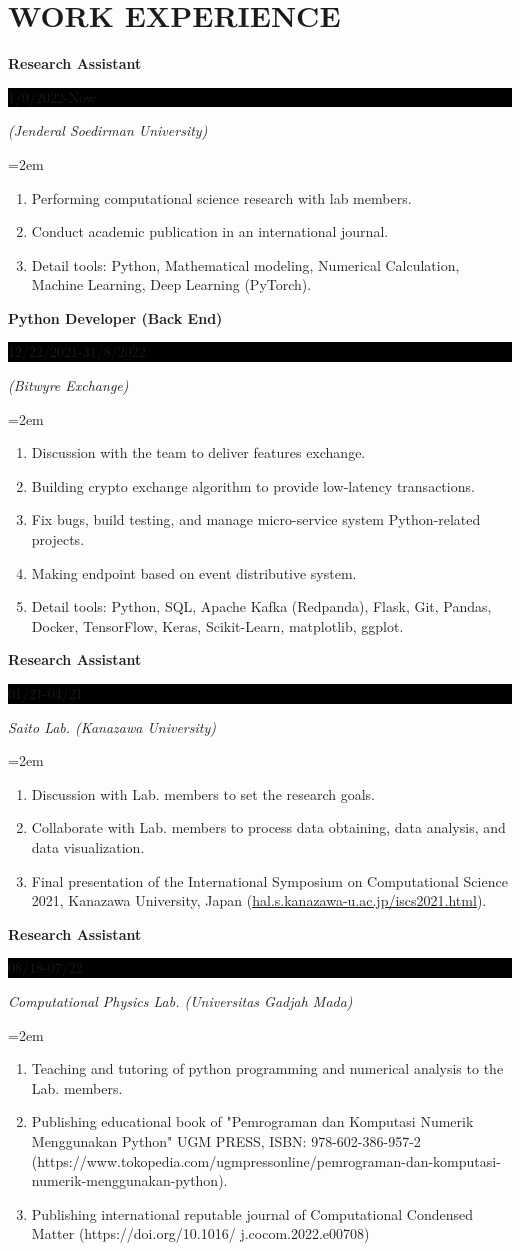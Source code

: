 \documentclass[paper=a4,fontsize=10pt]{scrartcl} %
\newcommand{\sepspace}{\vspace*{1em}}		%
\newcommand{\NewPart}[1]{\section*{\uppercase{#1}}}
\newcommand{\EducationEntry}[4]{
		\noindent \textbf{#1} \hfill      %
		\colorbox{Black}{%
			\parbox{6em}{%
			\hfill\color{White}#2}} \par  %
		\noindent \textit{#3} \par        %
		\noindent\hangindent=2em\hangafter=0 \small #4 %
		\normalsize \par}
\begin{document}
\NewPart{Work experience}{}

\EducationEntry{Research Assistant}{1/9/2022-Now}{(Jenderal Soedirman University)}{
	\begin{enumerate}
		\item Performing computational science research with lab members.
		\item Conduct academic publication in an international journal.
		\item Detail tools: Python, Mathematical modeling, Numerical Calculation, Machine Learning, Deep Learning (PyTorch).
	\end{enumerate}
}


\EducationEntry{Python Developer (Back End)}{12/22/2021-31/8/2022}{(Bitwyre Exchange)}{
	\begin{enumerate}
		\item Discussion with the team to deliver features exchange.
		\item Building crypto exchange algorithm to provide low-latency transactions.
		\item Fix bugs, build testing, and manage micro-service system Python-related projects.
		\item Making endpoint based on event distributive system.
		\item Detail tools: Python, SQL, Apache Kafka (Redpanda), Flask, Git, Pandas, Docker, TensorFlow, Keras, Scikit-Learn, matplotlib, ggplot.	
	\end{enumerate}
}

\sepspace

\EducationEntry{Research Assistant}{01/21-04/21}{Saito Lab. (Kanazawa University)}{
	\begin{enumerate}
		\item Discussion with Lab. members to set the research goals.
		\item Collaborate with Lab. members to process data obtaining, data analysis, and data visualization.
		\item Final presentation of the International Symposium on Computational Science 2021, Kanazawa University, Japan (\url{hal.s.kanazawa-u.ac.jp/iscs2021.html}).
	\end{enumerate}
}

\sepspace

\EducationEntry{Research Assistant}{08/18-07/22}{Computational Physics Lab. (Universitas Gadjah Mada)}{
		\begin{enumerate}
		\item Teaching and tutoring of python programming and numerical analysis to the Lab. members. 
		\item Publishing educational book of "Pemrograman dan Komputasi Numerik Menggunakan Python" UGM PRESS, ISBN: 978-602-386-957-2 (https://www.tokopedia.com/ugmpressonline/pemrograman-dan-komputasi-numerik-menggunakan-python). 
		\item Publishing international reputable journal of Computational Condensed Matter 
		(https://doi.org/10.1016/ j.cocom.2022.e00708)
	\end{enumerate}
}
\end{document}
